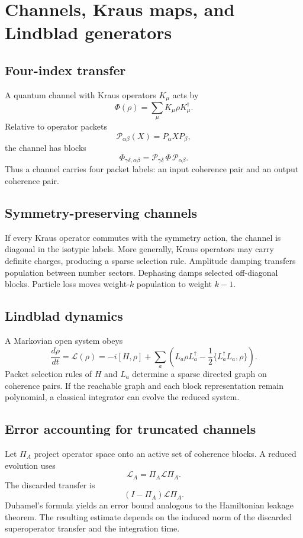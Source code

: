 \section{Channels, Kraus maps, and Lindblad generators}
\label{s:ch:channels}

\subsection{Four-index transfer}
A quantum channel with Kraus operators $K_\mu$ acts by
\[
\Phi(\rho)
=
\sum_\mu K_\mu\rho K_\mu^\dagger.
\]
Relative to operator packets
\[
\mathcal P_{\alpha\beta}(X)
=
P_\alpha X P_\beta,
\]
the channel has blocks
\[
\Phi_{\gamma\delta,\alpha\beta}
=
\mathcal P_{\gamma\delta}
\,\Phi\,
\mathcal P_{\alpha\beta}.
\]
Thus a channel carries four packet labels: an input coherence pair and an output coherence pair.

\subsection{Symmetry-preserving channels}
If every Kraus operator commutes with the symmetry action, the channel is diagonal in the isotypic labels. More generally, Kraus operators may carry definite charges, producing a sparse selection rule. Amplitude damping transfers population between number sectors. Dephasing damps selected off-diagonal blocks. Particle loss moves weight-$k$ population to weight $k-1$.

\subsection{Lindblad dynamics}
A Markovian open system obeys
\[
\frac{d\rho}{dt}
=
\mathcal L(\rho)
=
-i[H,\rho]
+
\sum_a
\left(
L_a\rho L_a^\dagger
-
\frac12\{L_a^\dagger L_a,\rho\}
\right).
\]
Packet selection rules of $H$ and $L_a$ determine a sparse directed graph on coherence pairs. If the reachable graph and each block representation remain polynomial, a classical integrator can evolve the reduced system.

\subsection{Error accounting for truncated channels}
Let $\Pi_A$ project operator space onto an active set of coherence blocks. A reduced evolution uses
\[
\mathcal L_A
=
\Pi_A\mathcal L\Pi_A.
\]
The discarded transfer is
\[
(I-\Pi_A)\mathcal L\Pi_A.
\]
Duhamel's formula yields an error bound analogous to the Hamiltonian leakage theorem. The resulting estimate depends on the induced norm of the discarded superoperator transfer and the integration time.

